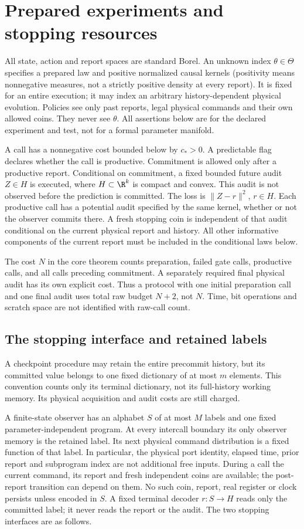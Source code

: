 \section{Prepared experiments and stopping resources}
\label{sec:experiment}
All state, action and report spaces are standard Borel. An unknown index $\theta\in\Theta$ specifies a prepared law and positive normalized causal kernels (positivity means nonnegative measures, not a strictly positive density at every report). It is fixed for an entire execution; it may index an arbitrary history-dependent physical evolution. Policies see only past reports, legal physical commands and their own allowed coins. They never see $\theta$. All assertions below are for the declared experiment and test, not for a formal parameter manifold.

A call has a nonnegative cost bounded below by $c_*>0$. A predictable flag declares whether the call is productive. Commitment is allowed only after a productive report. Conditional on commitment, a fixed bounded future audit $Z\in H$ is executed, where $H\subset\R^k$ is compact and convex. This audit is not observed before the prediction is committed. The loss is $\|Z-r\|^2$, $r\in H$. Each productive call has a potential audit specified by the same kernel, whether or not the observer commits there. A fresh stopping coin is independent of that audit conditional on the current physical report and history. All other informative components of the current report must be included in the conditional laws below.

The cost $N$ in the core theorem counts preparation, failed gate calls, productive calls, and all calls preceding commitment. A separately required final physical audit has its own explicit cost. Thus a protocol with one initial preparation call and one final audit uses total raw budget $N+2$, not $N$. Time, bit operations and scratch space are not identified with raw-call count.

\subsection*{The stopping interface and retained labels}
A checkpoint procedure may retain the entire precommit history, but its committed value belongs to one fixed dictionary of at most $m$ elements. This convention counts only its terminal dictionary, not its full-history working memory. Its physical acquisition and audit costs are still charged.

A finite-state observer has an alphabet $S$ of at most $M$ labels and one fixed parameter-independent program. At every intercall boundary its only observer memory is the retained label. Its next physical command distribution is a fixed function of that label. In particular, the physical port identity, elapsed time, prior report and subprogram index are not additional free inputs. During a call the current command, its report and fresh independent coins are available; the post-report transition can depend on them. No such coin, report, real register or clock persists unless encoded in $S$. A fixed terminal decoder $r:S\to H$ reads only the committed label; it never reads the report or the audit. The two stopping interfaces are as follows.

